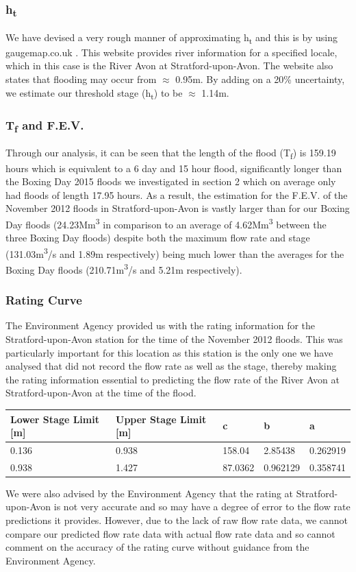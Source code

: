 \documentclass[11 pt, a4paper]{article}
\begin{document}
\subsubsection{h\textsubscript{t}}
We have devised a very rough manner of approximating h\textsubscript{t} and this is by using gaugemap.co.uk \cite{6}. This website provides river information for a specified locale, which in this case is the River Avon at Stratford-upon-Avon. The website also states that flooding may occur from $\approx$ 0.95m. By adding on a 20\% uncertainty, we estimate our threshold stage (h\textsubscript{t}) to be $\approx$ 1.14m.
\subsubsection{T\textsubscript{f} and F.E.V.}
Through our analysis, it can be seen that the length of the flood (T\textsubscript{f}) is 159.19 hours which is equivalent to a 6 day and 15 hour flood, significantly longer than the Boxing Day 2015 floods we investigated in section 2 which on average only had floods of length 17.95 hours. As a result, the estimation for the F.E.V. of the November 2012 floods in Stratford-upon-Avon is vastly larger than for our Boxing Day floods (24.23Mm\textsuperscript{3} in comparison to an average of 4.62Mm\textsuperscript{3} between the three Boxing Day floods) despite both the maximum flow rate and stage (131.03m\textsuperscript{3}/s and 1.89m respectively) being much lower than the averages for the Boxing Day floods (210.71m\textsuperscript{3}/s and 5.21m respectively).
\subsubsection{Rating Curve}
The Environment Agency provided us with the rating information for the Stratford-upon-Avon station for the time of the November 2012 floods. This was particularly important for this location as this station is the only one we have analysed that did not record the flow rate as well as the stage, thereby making the rating information essential to predicting the flow rate of the River Avon at Stratford-upon-Avon at the time of the flood.\\
\begin{center}
\begin{tabular}{|l|l|l|l|l|}
\hline
Lower Stage Limit {[}m{]} & Upper Stage Limit {[}m{]} & c & b & a \\
\hline
0.136 & 0.938 & 158.04 & 2.85438 & 0.262919 \\
0.938 & 1.427 & 87.0362 & 0.962129 & 0.358741 \\
\hline
\end{tabular}
\end{center}
We were also advised by the Environment Agency that the rating at Stratford-upon-Avon is not very accurate and so may have a degree of error to the flow rate predictions it provides. However, due to the lack of raw flow rate data, we cannot compare our predicted flow rate data with actual flow rate data and so cannot comment on the accuracy of the rating curve without guidance from the Environment Agency.
\end{document}
